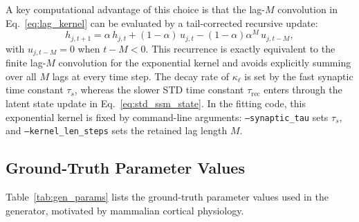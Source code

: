 \documentclass[11pt]{article}
\begin{document}
A key computational advantage of this choice is that the lag-$M$ convolution
in Eq.~\eqref{eq:lag_kernel} can be evaluated by a tail-corrected recursive
update:
\begin{equation}
h_{j,t+1}
=
\alpha\,h_{j,t} + (1-\alpha)\,u_{j,t}
-
(1-\alpha)\alpha^{M}\,u_{j,t-M},
\label{eq:recursive_kernel}
\end{equation}
with $u_{j,t-M}=0$ when $t-M<0$. This recurrence is exactly equivalent to the
finite lag-$M$ convolution for the exponential kernel and avoids explicitly
summing over all $M$ lags at every time step. The decay rate of $\kappa_\ell$
is set by the fast synaptic time constant $\tau_s$, whereas the slower STD time
constant $\tau_{\mathrm{rec}}$ enters through the latent state update in
Eq.~\eqref{eq:std_ssm_state}.
In the fitting code, this exponential kernel is fixed by command-line arguments:
\texttt{--synaptic\_tau} sets $\tau_s$, and \texttt{--kernel\_len\_steps} sets
the retained lag length $M$.

\subsection{Ground-Truth Parameter Values}
\label{sec:gen_params}

Table~\ref{tab:gen_params} lists the ground-truth parameter values used in the
generator, motivated by mammalian cortical physiology.
\end{document}
